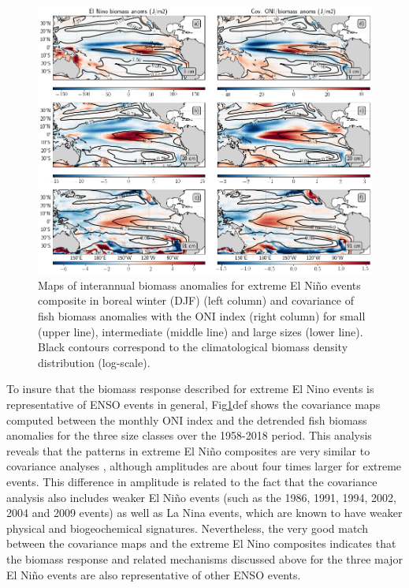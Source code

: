 \begin{figure}[h!tp]
	\centering
	\includegraphics[scale=0.4]{figs/map_mean_anom_OND_97.png}	
	\caption{Maps of interannual biomass anomalies for extreme El Niño events composite in boreal winter (DJF) (left column) and covariance of fish biomass anomalies with the ONI index (right column) for small (upper line), intermediate (middle line) and large sizes (lower line). Black contours correspond to the climatological biomass density distribution (log-scale).}	
	\label{fig:mean_ond97_ape}
\end{figure}


To insure that the biomass response described for extreme El Nino events is representative of ENSO events in general, Fig\ref{fig:mean_ond97_ape}def shows the covariance maps computed between the monthly ONI index and the detrended fish biomass anomalies for the three size classes over the 1958-2018 period. This analysis reveals that the patterns in extreme El Niño composites are very similar to covariance analyses , although amplitudes are about four times larger for extreme events. This  difference  in amplitude is related to the fact that the covariance analysis also includes weaker El Niño events (such as the 1986, 1991, 1994, 2002, 2004 and 2009 events) as well as La Nina events, which are known to have weaker physical and biogeochemical signatures. Nevertheless, the very good match between the covariance maps and the extreme El Nino composites indicates that the biomass response and related mechanisms discussed above for the three major El Niño events are also representative of other ENSO events.
